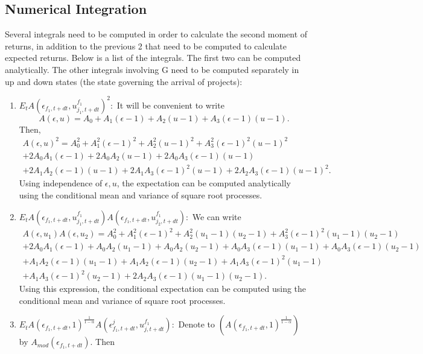 \subsection{Numerical Integration}
Several integrals need to be computed in order to calculate the second moment of returns, in addition to the previous 2 that need to be computed to calculate expected returns. Below is a list of the integrals. The first two can be computed analytically. The other integrals involving G need to be computed separately in up and down states (the state governing the arrival of projects):
\begin{enumerate}
\item $E_t A(\epsilon_{f_1, t+dt}, u_{j_1,t+dt}^{f_1})^2:$ It will be convenient to write \[
A(\epsilon, u) = A_0 + A_1(\epsilon - 1) + A_2(u-1) + A_3(\epsilon-1)(u-1). 
\]
Then, 
\begin{multline*}
    A(\epsilon, u)^2 = A_0^2 + A_1^2(\epsilon - 1)^2 + A_2^2(u-1)^2 + A_3^2(\epsilon-1)^2(u-1)^2 \\
    + 2 A_0 A_1(\epsilon - 1) + 2 A_0 A_2(u-1) + 2 A_0 A_3(\epsilon-1)(u-1) \\
    + 2 A_1 A_2 (\epsilon - 1)(u-1) + 2 A_1 A_3 (\epsilon-1)^2 (u-1) + 2 A_2 A_3 (\epsilon-1)(u-1)^2.
\end{multline*}
Using independence of $\epsilon, u$, the expectation can be computed analytically using the conditional mean and variance of square root processes.
\item $E_t A(\epsilon_{f_1, t+dt}, u_{j_1,t+dt}^{f_1}) A(\epsilon_{f_1, t+dt}, u_{j_2,t+dt}^{f_1}):$ We can write 
\begin{multline*}
    A(\epsilon, u_1) A(\epsilon, u_2) = A_0^2 + A_1^2(\epsilon - 1)^2 + A_2^2(u_1-1)(u_2 - 1) + A_3^2 (\epsilon - 1)^2(u_1 - 1)(u_2 - 1) \\
    + 2 A_0 A_1(\epsilon - 1) + A_0 A_2(u_1-1)+ A_0 A_2(u_2-1) + A_0 A_3(\epsilon-1)(u_1-1)+ A_0 A_3(\epsilon-1)(u_2-1) \\
    + A_1 A_2 (\epsilon - 1)(u_1-1) + A_1 A_2 (\epsilon - 1)(u_2-1) +  A_1 A_3 (\epsilon-1)^2 (u_1-1)\\
    +  A_1 A_3 (\epsilon-1)^2 (u_2-1) + 2 A_2 A_3 (\epsilon-1)(u_1-1)(u_2 - 1).
\end{multline*}
Using this expression, the conditional expectation can be computed using the conditional mean and variance of square root processes. 
\item $ E_t A(\epsilon_{f_1, t+dt}, 1)^{\frac{1}{1 - \alpha}} A(\epsilon_{f_1, t+dt}^j, u_{j, t+dt}^{f_1}):$ Denote to $(A(\epsilon_{f_1, t+dt}, 1)^{\frac{1}{1 - \alpha}})$ by $A_{mod}(\epsilon_{f_1, t+dt}).$ Then \begin{equation*}

\end{equation*}
\end{enumerate}
